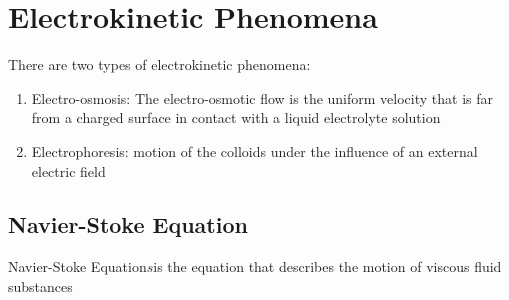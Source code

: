 \documentclass[12pt,a4paper]{article}
\begin{document}
\section{Electrokinetic Phenomena}
There are two types of electrokinetic phenomena:
\begin{enumerate}
    \item Electro-osmosis: The electro-osmotic flow is the uniform velocity that is far from a charged surface in contact with a liquid electrolyte solution
    \item Electrophoresis: motion of the colloids under the influence of an external electric field
\end{enumerate}
\subsection{Navier-Stoke Equation}
\begin{definition}
    {Navier-Stoke Equation}{$ s$}{is the equation that describes the motion of viscous fluid substances}
\end{definition}
\end{document}
